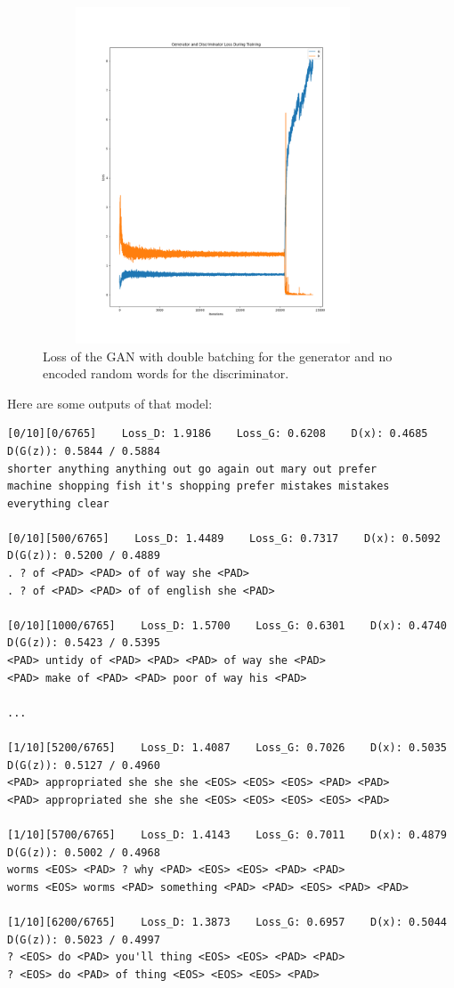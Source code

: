 \documentclass{article}
\begin{document}
\begin{figure}[ht]
    \centering
    \captionsetup{width=0.7\textwidth}
    \includegraphics[width=0.9\textwidth, height=10cm]{GAN-loss-double_batch-Adam-no_random.png}
    \caption{%
        Loss of the GAN with double batching for the generator and no encoded
        random words for the discriminator.
    }\label{fig:ganLossAdamNoRandom}
\end{figure}

Here are some outputs of that model:

\begin{verbatim}
[0/10][0/6765]    Loss_D: 1.9186    Loss_G: 0.6208    D(x): 0.4685    D(G(z)): 0.5844 / 0.5884
shorter anything anything out go again out mary out prefer
machine shopping fish it's shopping prefer mistakes mistakes everything clear

[0/10][500/6765]    Loss_D: 1.4489    Loss_G: 0.7317    D(x): 0.5092    D(G(z)): 0.5200 / 0.4889
. ? of <PAD> <PAD> of of way she <PAD>
. ? of <PAD> <PAD> of of english she <PAD>

[0/10][1000/6765]    Loss_D: 1.5700    Loss_G: 0.6301    D(x): 0.4740    D(G(z)): 0.5423 / 0.5395
<PAD> untidy of <PAD> <PAD> <PAD> of way she <PAD>
<PAD> make of <PAD> <PAD> poor of way his <PAD>

...

[1/10][5200/6765]    Loss_D: 1.4087    Loss_G: 0.7026    D(x): 0.5035    D(G(z)): 0.5127 / 0.4960
<PAD> appropriated she she she <EOS> <EOS> <EOS> <PAD> <PAD>
<PAD> appropriated she she she <EOS> <EOS> <EOS> <EOS> <PAD>

[1/10][5700/6765]    Loss_D: 1.4143    Loss_G: 0.7011    D(x): 0.4879    D(G(z)): 0.5002 / 0.4968
worms <EOS> <PAD> ? why <PAD> <EOS> <EOS> <PAD> <PAD>
worms <EOS> worms <PAD> something <PAD> <PAD> <EOS> <PAD> <PAD>

[1/10][6200/6765]    Loss_D: 1.3873    Loss_G: 0.6957    D(x): 0.5044    D(G(z)): 0.5023 / 0.4997
? <EOS> do <PAD> you'll thing <EOS> <EOS> <PAD> <PAD>
? <EOS> do <PAD> of thing <EOS> <EOS> <EOS> <PAD>

\end{verbatim}
\end{document}
